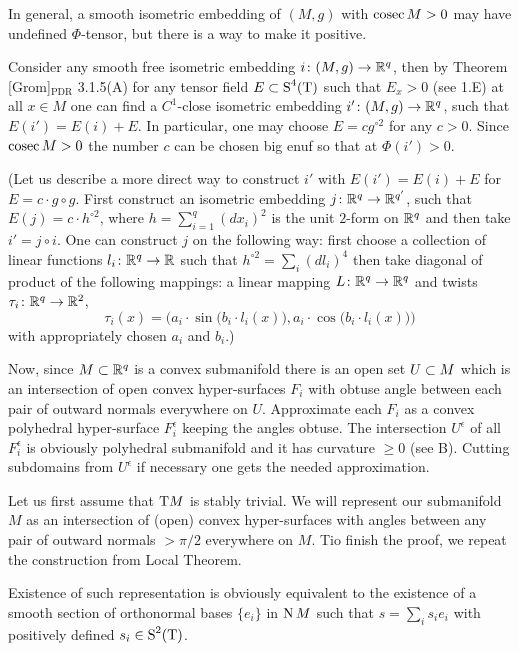 \documentclass{article}
\begin{document}
In general, a smooth isometric embedding of $(M,g)$ with $\mathop{\rm cosec}\nolimits M>0$
may have undefined $\Phi$-tensor, but there is a way to make it positive.

Consider any smooth free isometric embedding  $i\colon(M,g)\to\mathbb{R}^q$, then by
Theorem [Grom]${}_{\text{PDR}}$ 3.1.5(A) for any tensor field $E\subset \text{\rm S}^4(\text{\rm T})$
such that $E_x>0$ (see 1.E) at all $x\in M$
one can find a $C^1$-close isometric embedding
$i'\colon(M,g)\to \mathbb{R}^q$, such that $E(i')=E(i)+E$.
In particular, one may choose $E=cg^{\circ 2}$ for any $c>0$.
Since $\mathop{\rm cosec}\nolimits M>0$ the number $c$ can be chosen  big enuf so that
at $\Phi(i')>0$.

(Let us describe a more direct way to construct $i'$ with $E(i')=E(i)+E$ for $E=c\cdot g\circ g$.
First construct an isometric embedding $j\colon\mathbb{R}^q\to \mathbb{R}^{q'}$,
such that
$E(j)=c\cdot h^{\circ 2}$, where $h=\sum_{i=1}^q (dx_i)^2$
is the unit $2$-form on $\mathbb{R}^q$ and then take $i'=j\circ i$.
One can construct $j$ on the following way:
first choose a collection of linear functions $l_i\colon\mathbb{R}^q\to \mathbb{R}$
such that $h^{\circ 2} = \sum_i (dl_i)^4$ then take diagonal
of product of the following mappings: a linear mapping $L\colon\mathbb{R}^q\to \mathbb{R}^q$
and twists $\tau_i\colon \mathbb{R}^q\to \mathbb{R}^2$,
\[\tau_i(x)=
\bigl(a_i\cdot  \sin \bigl(b_i\cdot l_i(x)\bigr),a_i\cdot  \cos \bigl(b_i\cdot l_i(x)\bigr)\bigr)\]
with appropriately chosen $a_i$ and $b_i$.)

Now, since $M\subset \mathbb{R}^q$ is a convex submanifold there is an open
set $U\subset M$ which is an intersection of open convex hyper-surfaces
$F_i$ with obtuse angle between each pair of outward normals
everywhere on $U$.
Approximate each $F_i$ as a convex polyhedral hyper-surface $F_i^\epsilon$ keeping the angles obtuse.
The intersection $U^\epsilon$ of all $F_i^\epsilon$ is obviously polyhedral submanifold
and it has curvature $\ge 0$ (see B). Cutting subdomains from
$U^\epsilon$ if necessary one gets the needed approximation. \qeds


 Let us first assume that
$\text{\rm T} M$ is stably trivial.
We will represent our submanifold $M$ as
an intersection of (open) convex hyper-surfaces with angles between any pair of outward normals $>\pi/2$
everywhere on $M$.
Tio finish the proof, we repeat the construction from  Local Theorem.

Existence of such representation is obviously equivalent to the
existence of a smooth section of orthonormal bases $\{e_i\}$ in
$\text{\rm N}\, M$ such that $s=\sum_i s_i e_i$ with positively defined
$s_i\in \text{\rm S}^2(\text{\rm T})$.
\end{document}
